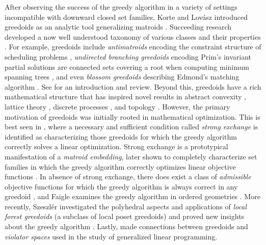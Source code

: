 \documentclass[11pt]{article}
\begin{document}
After observing the success of the greedy algorithm in a variety of settings incompatible with downward closed set families, Korte and Lovász introduced greedoids as an analytic tool generalizing matroids \cite{korte1984structural,korte2012greedoids}.
Succeeding research developed a now well understood taxonomy of various classes and their properties \cite{korte1986non,korte1985note,schmidt1991greedoids,schmidt1988characterization,boyd1990algorithmic,korte1988intersection,goecke1988greedy,brylawski1988exchange}.
For example, greedoids include \emph{antimatroids} encoding the constraint structure of scheduling problems \cite{boyd1990algorithmic}, \emph{undirected branching greedoids} encoding Prim's invariant partial solutions are connected sets covering a root when computing minimum spanning trees \cite{korte1984structural,schmidt1988characterization}, and even \emph{blossom greedoids} describing Edmond's matching algorithm \cite{korte1984structural,korte1986non}.
See \cite{korte2012greedoids} for an introduction and review.
Beyond this, greedoids have a rich mathematical structure that has inspired novel results in abstract convexity \cite{ahrens1999convexity,edelman1985theory}, lattice theory \cite{faigle1980geometries,crapo1984selectors,czedli2023revisiting}, discrete processes \cite{bjorner1991chip,bjorner2008random}, and topology \cite{bjorner1985homotopy}.
However, the primary motivation of greedoids was initially rooted in mathematical optimization.
This is best seen in \cite{korte1984greedoids,goetschel1986linear}, where a necessary and sufficient condition called \emph{strong exchange} is identified as characterizing those greedoids for which the greedy algorithm correctly solves a linear optimization.
Strong exchange is a prototypical manifestation of a \emph{matroid embedding}, later shown to completely characterize set families in which the greedy algorithm correctly optimizes linear objective functions \cite{helman1993exact}.
In absence of strong exchange, there does exist a class of \emph{admissible} objective functions for which the greedy algorithm is always correct in any greedoid \cite{korte2012greedoids,szeszler2022sufficient},
and Faigle examines the greedy algorithm
in ordered geometries \cite{faigle1980geometries}.
More recently, Szeszl{\'e}r investigated the polyhedral aspects and applications of \emph{local forest greedoids} (a subclass of local poset greedoids) \cite{szeszler2021new} and proved new insights about the greedy algorithm \cite{szeszler2022sufficient}.
Lastly, \cite{kempner2024greedoids} made connections between greedoids and \emph{violator spaces} \cite{amenta1993helly,gartner2008violator} used in the study of generalized linear programming.
\end{document}
